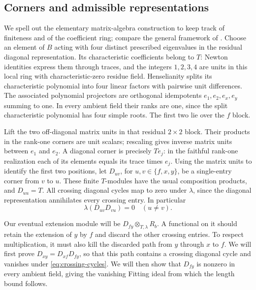 \subsection{Corners and admissible representations}

We spell out the elementary matrix-algebra construction to keep
track of finiteness and of the coefficient ring; compare the general
framework of \citet[Sections~1.3--1.5]{BellaicheChenevier2009}.
Choose an element of $B$ acting with four distinct prescribed
eigenvalues in the residual diagonal representation.  Its
characteristic coefficients belong to $T$: Newton identities express
them through traces, and the integers $1,2,3,4$ are units in this
local ring with characteristic-zero residue field.  Henselianity splits its characteristic
polynomial into four linear factors with pairwise unit differences.
The associated polynomial projectors are orthogonal idempotents
$e_1,e_2,e_x,e_y$ summing to one.  In every ambient field their ranks
are one, since the split characteristic polynomial has four simple
roots.  The first two lie over the $f$ block.

Lift the two off-diagonal matrix units in that residual $2\times2$
block.  Their products in the rank-one corners are unit scalars;
rescaling gives inverse matrix units between $e_1$ and $e_2$.
A diagonal corner is precisely $T e_j$: in the faithful rank-one
realization each of its elements equals its trace times $e_j$.
Using the matrix units to identify the first two positions, let
$D_{uv}$, for $u,v\in\{f,x,y\}$, be a single-entry corner from $v$
to $u$.  These finite $T$-modules have the usual composition products,
and $D_{uu}=T$.  All crossing diagonal cycles map to zero under
$\lambda$, since the diagonal representation annihilates every
crossing entry.  In particular
\begin{equation}
 \lambda(D_{uv}D_{vu})=0\quad(u\ne v).
 \label{eq:crossing-cycles}
\end{equation}

Our eventual extension module will be
$D_{fy}\otimes_{T,\lambda}R_b$.  A functional on it should retain
the extension of $y$ by $f$ and discard the other crossing entries.
To respect multiplication, it must also kill the discarded path from
$y$ through $x$ to $f$.  We will first prove
$D_{xy}=D_{xf}D_{fy}$, so that this path contains a crossing diagonal
cycle and vanishes under \cref{eq:crossing-cycles}.  We will then show
that $D_{fy}$ is nonzero in every ambient field, giving the vanishing
Fitting ideal from which the length bound follows.

